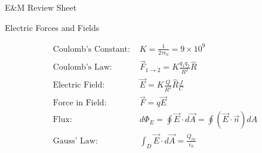 \documentclass[12pt]{article}
\renewcommand{\=}[1]{\stackrel{#1}{=}} %
\theoremstyle{definition}
\theoremstyle{remark}
\begin{document}
\begin{center}
  E\&M Review Sheet
\end{center}
\begin{center}
  Electric Forces and Fields
\end{center}
\begin{align*}  
  \textrm{Coulomb's Constant: }& K = \frac{1}{2\tau \epsilon_0} = 9 \times 10^9\\
  \textrm{Coulomb's Law: }& \vec{F}_{1\rightarrow 2} = K\frac{q_1q_2}{R^2}\hat{R}\\
  \textrm{Electric Field: }& \vec{E} = K\frac{Q}{R^2}\hat{R}\frac{J}{C}\\
  \textrm{Force in Field: }& \vec{F} = q\vec{E}\\
  \textrm{Flux: }&d\Phi_E = \oint \vec{E} \cdot d \vec{A} = \oint
  (\vec{E} \cdot \vec{n})dA\\
  \textrm{Gauss' Law:}& \int_{D}\vec E \cdot d\vec A = \frac{Q_{in}}{\epsilon_0}\\
\end{align*}
  
\end{document}
